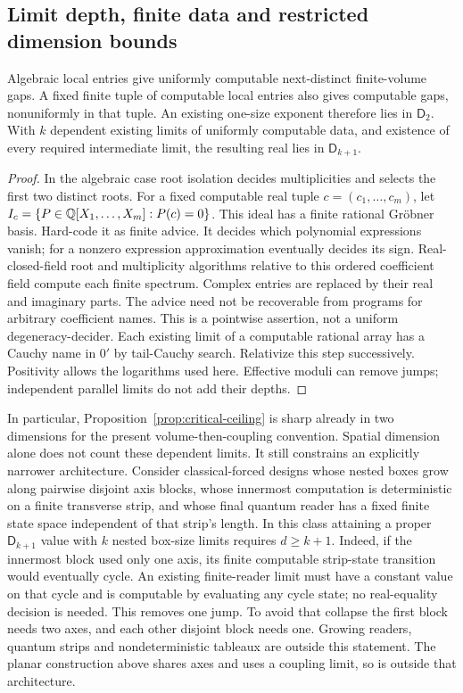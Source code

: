 \subsection{Limit depth, finite data and restricted dimension bounds}
\begin{proposition}
\label{prop:register-ceilings}
Algebraic local entries give uniformly computable next-distinct
finite-volume gaps. A fixed finite tuple of computable local entries
also gives computable gaps, nonuniformly in that tuple. An existing
one-size exponent therefore lies in $\mathsf D_2$.
With $k$ dependent existing limits of uniformly computable data,
and existence of every required intermediate limit, the resulting
real lies in $\mathsf D_{k+1}$.
\end{proposition}
\begin{proof}
In the algebraic case root isolation decides multiplicities and
selects the first two distinct roots. For a fixed computable real
tuple $c=(c_1,\ldots,c_m)$, let
$I_c=\{P\in\mathbb Q[X_1,\ldots,X_m]:P(c)=0\}$.
This ideal has a finite rational Gr\"obner basis. Hard-code it as
finite advice. It decides which polynomial expressions vanish;
for a nonzero expression approximation eventually decides its sign.
Real-closed-field root and multiplicity algorithms relative to this
ordered coefficient field compute each finite spectrum. Complex
entries are replaced by their real and imaginary parts. The advice
need not be recoverable from programs for arbitrary coefficient names.
This is a pointwise assertion, not a uniform degeneracy-decider.
Each existing limit of a computable rational array has a Cauchy name
in $0'$ by tail-Cauchy search. Relativize this step successively.
Positivity allows the logarithms used here. Effective moduli can
remove jumps; independent parallel limits do not add their depths.
\end{proof}

In particular, Proposition~\ref{prop:critical-ceiling} is sharp
already in two dimensions for the present volume-then-coupling
convention. Spatial dimension alone does not count these dependent
limits. It still constrains an explicitly narrower architecture.
Consider classical-forced designs whose nested boxes grow along
pairwise disjoint axis blocks, whose innermost computation is
deterministic on a finite transverse strip, and whose final quantum
reader has a fixed finite state space independent of that strip's
length. In this class attaining a proper $\mathsf D_{k+1}$ value
with $k$ nested box-size limits requires $d\geq k+1$.
Indeed, if the innermost block used only one axis, its finite
computable strip-state transition would eventually cycle. An existing
finite-reader limit must have a constant value on that cycle and is
computable by evaluating any cycle state; no real-equality decision
is needed. This removes one jump. To avoid that collapse the first
block needs two axes, and each other disjoint block needs one.
Growing readers, quantum strips and nondeterministic tableaux are
outside this statement. The planar construction above shares axes
and uses a coupling limit, so is outside that architecture.

